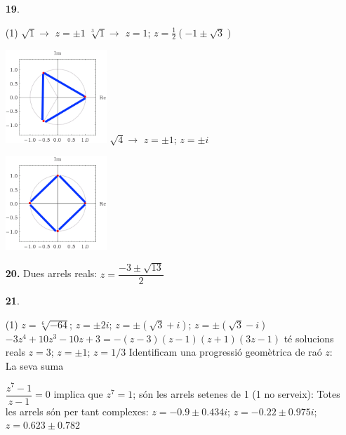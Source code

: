 \documentclass[a4paper, pdf, twoside]{book}
\begin{document}
\begin{multicols}{2}
\begin{enumerate}
 \item[\fontfamily{phv}\selectfont\color{blue}\textbf{19}. ] 
 \begin{tasks}[column-sep=1em, item-indent=1.3333em](1)
	 \task* $\sqrt {1} \rightarrow $ $z=\pm 1$
	 \task* $\sqrt [3]{1} \rightarrow $ $z=1$; $z=\frac {1}{2}(-1\pm \sqrt {3})$ \par \includegraphics [width=0.3\textwidth ]{img-sol/t4-19b}
	 \task* $\sqrt {4} \rightarrow $ $z=\pm 1$; $z=\pm i$ \par \includegraphics [width=0.3\textwidth ]{img-sol/t4-19c}
\end{tasks}
\vspace{0.25cm}
\item[\fontfamily{phv}\selectfont\color{blue}\textbf{20. }] 
Dues arrels reals: $z=\dfrac {-3\pm \sqrt {13}}{2}$
\vspace{0.25cm}



 \item[\fontfamily{phv}\selectfont\color{blue}\textbf{21}. ] 
 \begin{tasks}[column-sep=1em, item-indent=1.3333em](1)
	 \task* $z=\sqrt [6]{-64}$; $z=\pm 2i$; $z=\pm (\sqrt {3}+i)$; $z=\pm (\sqrt {3}-i)$
	 \task* $-3z^4+10z^3-10z+3=-(z-3)(z-1)(z+1)(3z-1)$ té solucions reals $z=3$; $z=\pm 1$; $z=1/3$
	 \task* Identificam una progressió geomètrica de raó $z$: La seva suma\par $\dfrac {z^7-1}{z-1}=0$ implica que $z^7=1$; són les arrels setenes de 1 (1 no serveix): Totes les arrels són per tant complexes: $z=-0.9 \pm 0.434 i$; $z=-0.22\pm 0.975 i$; $z=0.623 \pm 0.782$
\end{tasks}
\vspace{0.25cm}



\end{enumerate}
\end{multicols}
\end{document}
